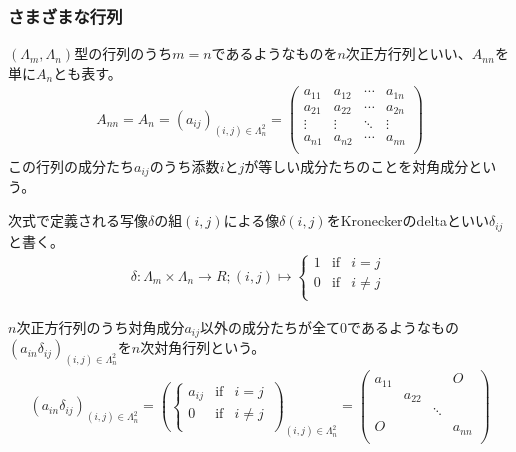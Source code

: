 \documentclass[dvipdfmx]{jsarticle}
\begin{document}
\subsubsection{さまざまな行列}%
\begin{dfn}
$\left( \varLambda_{m},\varLambda_{n} \right)$型の行列のうち$m = n$であるようなものを$n$次正方行列といい、$A_{nn}$を単に$A_{n}$とも表す。
\begin{align*}
A_{nn} = A_{n} = \left( a_{ij} \right)_{(i,j) \in \varLambda_{n}^{2}} = \begin{pmatrix}
a_{11} & a_{12} & \cdots & a_{1n} \\
a_{21} & a_{22} & \cdots & a_{2n} \\
 \vdots & \vdots & \ddots & \vdots \\
a_{n1} & a_{n2} & \cdots & a_{nn} \\
\end{pmatrix}
\end{align*}
この行列の成分たち$a_{ij}$のうち添数$i$と$j$が等しい成分たちのことを対角成分という。
\end{dfn}
\begin{dfn}
次式で定義される写像$\delta$の組$(i,j)$による像$\delta(i,j)$をKroneckerのdeltaといい$\delta_{ij}$と書く。
\begin{align*}
\delta:\varLambda_{m} \times \varLambda_{n} \rightarrow R;(i,j) \mapsto \left\{ \begin{matrix}
1 & \mathrm{if} & i = j \\
0 & \mathrm{if} & i \neq j \\
\end{matrix} \right.\ 
\end{align*}
\end{dfn}
\begin{dfn}
$n$次正方行列のうち対角成分$a_{ij}$以外の成分たちが全て0であるようなもの$\left( a_{in}\delta_{ij} \right)_{(i,j) \in \varLambda_{n}^{2}}$を$n$次対角行列という。
\begin{align*}
\left( a_{in}\delta_{ij} \right)_{(i,j) \in \varLambda_{n}^{2}} = \left( \left\{ \begin{matrix}
a_{ij} & \mathrm{if} & i = j \\
0 & \mathrm{if} & i \neq j \\
\end{matrix} \right.\  \right)_{(i,j) \in \varLambda_{n}^{2}} = \begin{pmatrix}
a_{11} & \  & \  & O \\
\  & a_{22} & \  & \  \\
\  & \  & \ddots & \  \\
O & \  & \  & a_{nn} \\
\end{pmatrix}
\end{align*}
\end{dfn}
\end{document}
